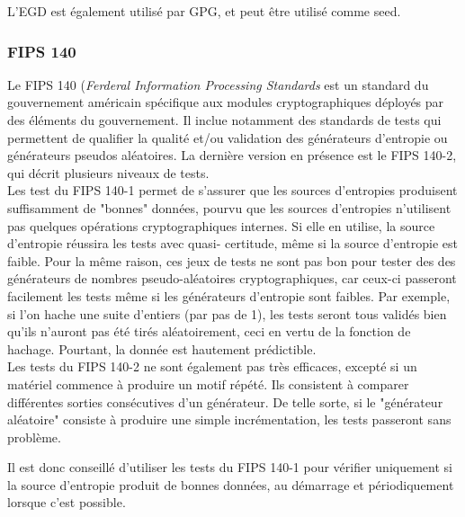 			L'EGD est également utilisé par GPG, et peut être utilisé comme 
			seed.
			
	\subsubsection{FIPS 140}
	
		Le FIPS 140 (\textit{Ferderal Information Processing Standards} est un 
		standard du gouvernement américain spécifique aux modules cryptographiques 
		déployés par des éléments du gouvernement. Il inclue notamment des standards 
		de tests qui permettent de qualifier la qualité et/ou validation des 
		générateurs d'entropie ou générateurs pseudos aléatoires. 
		La dernière version en présence est le FIPS 140-2, qui décrit plusieurs 
		niveaux de tests.\\
		
		
		Les test du FIPS 140-1 permet de s'assurer que les sources d'entropies 
		produisent suffisamment de "bonnes" données, pourvu que les sources d'entropies 
		n'utilisent pas quelques opérations cryptographiques internes. Si elle en utilise, 
		la source d'entropie réussira les tests avec quasi- certitude, même si la source 
		d'entropie est faible. Pour la même raison,  ces jeux de tests ne sont pas bon 
		pour tester des des générateurs de nombres pseudo-aléatoires cryptographiques, 
		car ceux-ci passeront facilement les tests même si les générateurs d'entropie 
		sont faibles. Par exemple, si l'on hache une suite d'entiers (par pas de 1), 
		les tests seront tous validés bien qu'ils n'auront pas été tirés aléatoirement, 
		ceci en vertu de la fonction de hachage. Pourtant, la donnée est hautement
		prédictible.\\
		
		
		Les tests du FIPS 140-2 ne sont également pas très efficaces, excepté si un matériel 
		commence à produire un motif répété. Ils consistent à comparer différentes sorties 
		consécutives d'un générateur.  De telle sorte, si le "générateur aléatoire" consiste 
		à produire une simple incrémentation, les tests passeront sans problème.
		
		Il est donc conseillé d'utiliser les tests du FIPS 140-1 pour vérifier uniquement 
		si la source d'entropie produit de bonnes données, au démarrage et périodiquement 
		lorsque c'est possible. 
		
